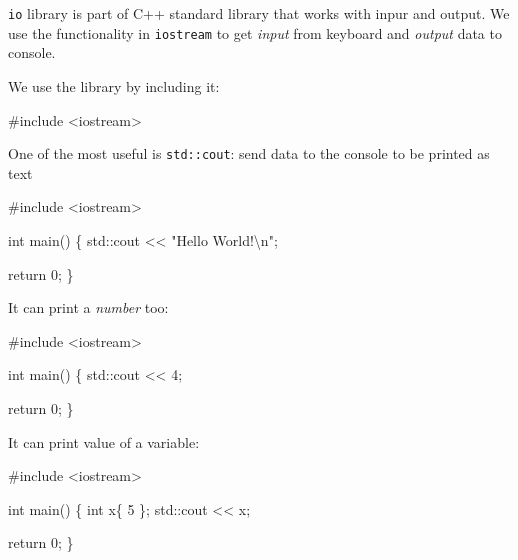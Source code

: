 \documentclass[
  letterpaper,
  DIV=11,
  numbers=noendperiod]{scrreprt}
\newenvironment{Shaded}{\begin{snugshade}}{\end{snugshade}}
\newcommand{\CommentTok}[1]{\textcolor[rgb]{0.37,0.37,0.37}{#1}}
\newcommand{\DecValTok}[1]{\textcolor[rgb]{0.68,0.00,0.00}{#1}}
\newcommand{\ErrorTok}[1]{\textcolor[rgb]{0.68,0.00,0.00}{#1}}
\newcommand{\FunctionTok}[1]{\textcolor[rgb]{0.28,0.35,0.67}{#1}}
\newcommand{\NormalTok}[1]{\textcolor[rgb]{0.00,0.23,0.31}{#1}}
\newcommand{\SpecialCharTok}[1]{\textcolor[rgb]{0.37,0.37,0.37}{#1}}
\newcommand{\StringTok}[1]{\textcolor[rgb]{0.13,0.47,0.30}{#1}}
\begin{document}
\texttt{io} library is part of C++ standard library that works with
inpur and output. We use the functionality in \texttt{iostream} to get
\emph{input} from keyboard and \emph{output} data to console.

We use the library by including it:

\begin{Shaded}
\begin{Highlighting}[]
\CommentTok{\#include \textless{}iostream\textgreater{}}
\end{Highlighting}
\end{Shaded}

One of the most useful is \texttt{std::cout}: send data to the console
to be printed as text

\begin{Shaded}
\begin{Highlighting}[]
\CommentTok{\#include \textless{}iostream\textgreater{}}

\NormalTok{int }\FunctionTok{main}\NormalTok{()}
\NormalTok{\{}
\NormalTok{  std}\SpecialCharTok{::}\NormalTok{cout }\SpecialCharTok{\textless{}}\ErrorTok{\textless{}} \StringTok{"Hello World!}\SpecialCharTok{\textbackslash{}n}\StringTok{"}\NormalTok{;}
  
\NormalTok{  return }\DecValTok{0}\NormalTok{;}
\NormalTok{\}}
\end{Highlighting}
\end{Shaded}

It can print a \emph{number} too:

\begin{Shaded}
\begin{Highlighting}[]
\CommentTok{\#include \textless{}iostream\textgreater{}}

\NormalTok{int }\FunctionTok{main}\NormalTok{()}
\NormalTok{\{}
\NormalTok{  std}\SpecialCharTok{::}\NormalTok{cout }\SpecialCharTok{\textless{}}\ErrorTok{\textless{}} \DecValTok{4}\NormalTok{;}
  
\NormalTok{  return }\DecValTok{0}\NormalTok{;}
\NormalTok{\}}
\end{Highlighting}
\end{Shaded}

It can print value of a variable:

\begin{Shaded}
\begin{Highlighting}[]
\CommentTok{\#include \textless{}iostream\textgreater{}}

\NormalTok{int }\FunctionTok{main}\NormalTok{()}
\NormalTok{\{}
\NormalTok{  int x\{ }\DecValTok{5}\NormalTok{ \};}
\NormalTok{  std}\SpecialCharTok{::}\NormalTok{cout }\SpecialCharTok{\textless{}}\ErrorTok{\textless{}}\NormalTok{ x;}
  
\NormalTok{  return }\DecValTok{0}\NormalTok{;}
\NormalTok{\}}
\end{Highlighting}
\end{Shaded}
\end{document}
